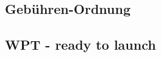 \documentclass[11pt]{scrartcl}
\begin{document}
\subsection{Gebühren-Ordnung}
\label{sec:fees}
\vspace{0.2cm}

\vspace{0.5cm}


\subsection{WPT - ready to launch}
\label{sec:wpt}
\vspace{0.2cm}
\vspace{0.5cm}


\end{document}
